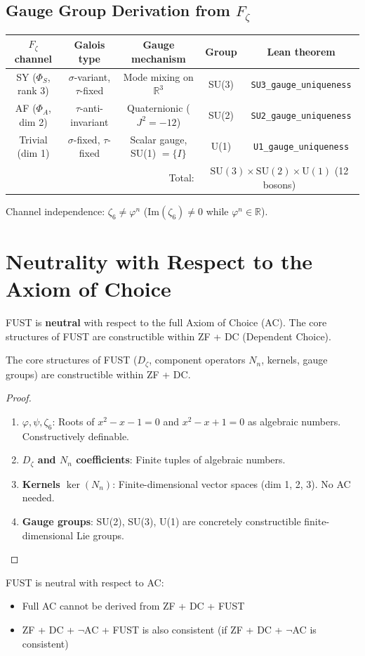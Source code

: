 \section{Gauge Group Derivation from \texorpdfstring{$F_\zeta$}{Fζ}}

\begin{center}
\begin{tabular}{|c|c|c|c|c|}
\hline
$F_\zeta$ channel & Galois type & Gauge mechanism & Group & Lean theorem \\
\hline
SY ($\Phi_S$, rank 3) & $\sigma$-variant, $\tau$-fixed & Mode mixing on $\mathbb{R}^3$ & SU(3) & \texttt{SU3\_gauge\_uniqueness} \\
AF ($\Phi_A$, dim 2) & $\tau$-anti-invariant & Quaternionic ($J^2 = -12$) & SU(2) & \texttt{SU2\_gauge\_uniqueness} \\
Trivial (dim 1) & $\sigma$-fixed, $\tau$-fixed & Scalar gauge, SU(1) $= \{I\}$ & U(1) & \texttt{U1\_gauge\_uniqueness} \\
\hline
\multicolumn{3}{|r|}{Total:} & \multicolumn{2}{c|}{$\mathrm{SU}(3) \times \mathrm{SU}(2) \times \mathrm{U}(1)$ (12 bosons)} \\
\hline
\end{tabular}
\end{center}

Channel independence: $\zeta_6 \neq \varphi^n$ ($\mathrm{Im}(\zeta_6) \neq 0$ while $\varphi^n \in \mathbb{R}$).

\chapter{Neutrality with Respect to the Axiom of Choice}
\label{app:ac_neutrality}

FUST is \textbf{neutral} with respect to the full Axiom of Choice (AC). The core structures of FUST are constructible within ZF + DC (Dependent Choice).

\begin{theorem}
\label{thm:zf_dc_constructible}
The core structures of FUST ($D_\zeta$, component operators $N_n$, kernels, gauge groups) are constructible within ZF + DC.
\end{theorem}

\begin{proof}
\begin{enumerate}
\item \textbf{$\varphi, \psi, \zeta_6$}: Roots of $x^2 - x - 1 = 0$ and $x^2 - x + 1 = 0$ as algebraic numbers. Constructively definable.
\item \textbf{$D_\zeta$ and $N_n$ coefficients}: Finite tuples of algebraic numbers.
\item \textbf{Kernels $\ker(N_n)$}: Finite-dimensional vector spaces (dim 1, 2, 3). No AC needed.
\item \textbf{Gauge groups}: SU(2), SU(3), U(1) are concretely constructible finite-dimensional Lie groups.
\end{enumerate}
\end{proof}

\begin{corollary}[AC Neutrality]
FUST is neutral with respect to AC:
\begin{itemize}
\item Full AC cannot be derived from ZF + DC + FUST
\item ZF + DC + $\neg$AC + FUST is also consistent (if ZF + DC + $\neg$AC is consistent)
\end{itemize}
\end{corollary}
